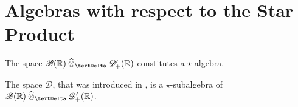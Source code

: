 \section{Algebras with respect to the Star Product}
\label{alg}


\begin{conjecture}
    The space $ \fsSmobnd( \nrR ) \cteproDi \fsDiscau( \nrR ) $
    constitutes a $ \star $-algebra.
\end{conjecture}

\begin{remark}
    The space $ \mathcal{D} $,
    that was introduced in \cite{RBG025,ryc025},
    is a $ \star $-subalgebra of $ \fsSmobnd( \nrR ) \cteproDi \fsDiscau( \nrR ) $.
\end{remark}
